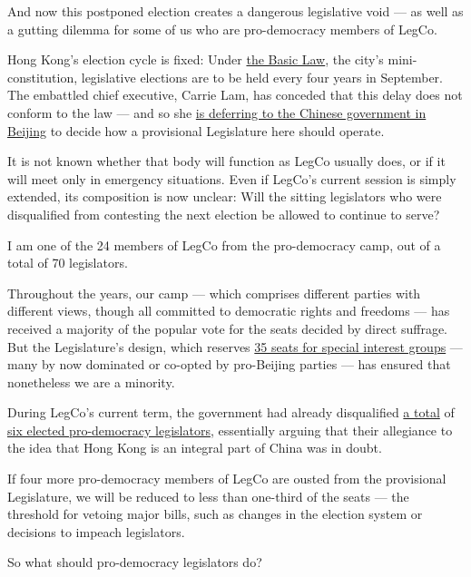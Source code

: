 And now this postponed election creates a dangerous legislative void ---
as well as a gutting dilemma for some of us who are pro-democracy
members of LegCo.

Hong Kong's election cycle is fixed: Under
\href{https://www.basiclaw.gov.hk/en/basiclawtext/images/basiclaw_full_text_en.pdf}{the
Basic Law}, the city's mini-constitution, legislative elections are to
be held every four years in September. The embattled chief executive,
Carrie Lam, has conceded that this delay does not conform to the law ---
and so she
\href{https://www.info.gov.hk/gia/general/202007/31/P2020073101081.htm?fontSize=1}{is
deferring to the Chinese government in Beijing} to decide how a
provisional Legislature here should operate.

It is not known whether that body will function as LegCo usually does,
or if it will meet only in emergency situations. Even if LegCo's current
session is simply extended, its composition is now unclear: Will the
sitting legislators who were disqualified from contesting the next
election be allowed to continue to serve?

I am one of the 24 members of LegCo from the pro-democracy camp, out of
a total of 70 legislators.

Throughout the years, our camp --- which comprises different parties
with different views, though all committed to democratic rights and
freedoms --- has received a majority of the popular vote for the seats
decided by direct suffrage. But the Legislature's design, which reserves
\href{https://www.reo.gov.hk/en/voter/FC.htm}{35 seats for special
interest groups} --- many by now dominated or co-opted by pro-Beijing
parties --- has ensured that nonetheless we are a minority.

During LegCo's current term, the government had already disqualified
\href{https://www.nytimes.com/2016/11/08/world/asia/china-hong-kong-sixtus-leung-yau-wai-ching.html}{a
total} of
\href{https://www.nytimes.com/2017/07/14/world/asia/hong-kong-court-pro-democracy-lawmakers.html}{six
elected pro-democracy legislators}, essentially arguing that their
allegiance to the idea that Hong Kong is an integral part of China was
in doubt.

If four more pro-democracy members of LegCo are ousted from the
provisional Legislature, we will be reduced to less than one-third of
the seats --- the threshold for vetoing major bills, such as changes in
the election system or decisions to impeach legislators.

So what should pro-democracy legislators do?

